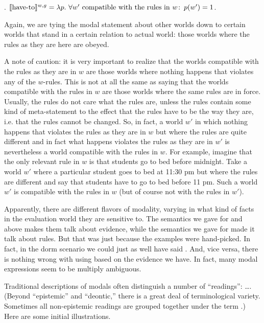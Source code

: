 \ex. $\sv{\mbox{have-to}}^{w,g} = \lambda p.\ \forall w' \mbox{ compatible with the rules in } w\co p(w') = 1$.

Again, we are tying the modal statement about other worlds down to
certain worlds that stand in a certain relation to actual world: those
worlds where the rules as they are here are obeyed.

A note of caution: it is very important to realize that the worlds
compatible with the rules as they are in $w$ are those worlds where
nothing happens that violates any of the $w$-rules. This is not at all
the same as saying that the worlds compatible with the rules in $w$
are those worlds where the same rules are in force. Usually, the rules
do not care what the rules are, unless the rules contain some kind of
meta-statement to the effect that the rules have to be the way they
are, i.e. that the rules cannot be changed. So, in fact, a world $w'$
in which nothing happens that violates the rules as they are in $w$
but where the rules are quite different and in fact what happens
violates the rules as they are in $w'$ is nevertheless a world
compatible with the rules in $w$. For example, imagine that the only
relevant rule in $w$ is that students go to bed before midnight. Take
a world $w'$ where a particular student goes to bed at 11:30 pm but
where the rules are different and say that students have to go to bed
before 11 pm. Such a world $w'$ is compatible with the rules in $w$
(but of course not with the rules in $w'$).

Apparently, there are different flavors of modality, varying in what
kind of facts in the evaluation world they are sensitive to. The
semantics we gave for  and  above
makes them talk about evidence, while the semantics we gave for
 made it talk about rules. But that was just
because the examples were hand-picked. In fact, in the dorm scenario
we could just as well have said . And,
vice versa, there is nothing wrong with using  based on the evidence we have. In fact, many
modal expressions seem to be multiply ambiguous.

Traditional descriptions of modals often distinguish a number of
``readings'':  \dots. (Beyond ``epistemic'' and ``deontic,'' there is a
great deal of terminological variety. Sometimes all non-epistemic
readings are grouped together under the term .)
Here are some initial illustrations.


